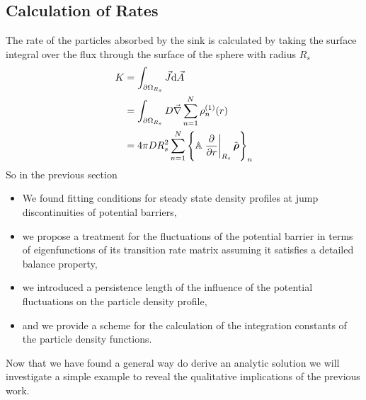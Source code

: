 \subsection{Calculation of Rates}
\label{Calculation_of_Rates}
The rate of the particles absorbed by the sink is calculated by taking the surface integral over the flux through the surface of the sphere with radius $R_s$
\begin{align}
    K   &= \int_{\partial \Omega_{R_s}} \vec{J} {\rm d} \vec{A}\nonumber\\
    &= \int_{\partial \Omega_{R_s}} D \vec{\nabla} \sum_{n=1}^{N} \rho_n^{(1)}(r)\nonumber \\
    &= 4 \pi D R_s^{2} \sum_{n=1}^{N} \left\{ \mathbb{A} \left. \frac{\partial}{ \partial r}\right|_{R_s} \tilde{\boldsymbol{\mathbf{\rho}}} \right\}_n
    \label{Rate}
\end{align}
        So in the previous section 
\begin{itemize}
    \item We found fitting conditions for steady state density profiles at jump discontinuities of potential barriers,
    \item we propose a treatment for the fluctuations of the potential barrier in terms of eigenfunctions of its transition rate matrix assuming it satisfies a detailed balance property,
    \item we introduced a persistence length of the influence of the potential fluctuations on the particle density profile,
    \item and we provide a scheme for the calculation of the integration constants of the particle density functions.
\end{itemize}
Now that we have found a general way do derive an analytic solution we will investigate a simple example to reveal the qualitative implications of the previous work. 
\newpage

